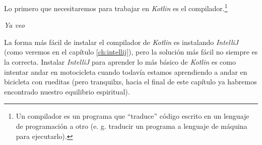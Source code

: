 Lo primero que necesitaremos para trabajar en \textit{Kotlin} es el 
compilador.\footnote{Un compilador es un programa que \enquote{traduce} código escrito en un 
lenguaje de programación a otro (e. g. traducir un programa a lenguaje de máquina para ejecutarlo).}
\begin{center}
  \textit{Ya veo}
\end{center}

La forma más fácil de instalar el compilador de \textit{Kotlin} es instalando 
\textit{IntelliJ} (como veremos en el capítulo \ref{ch:intellij}), pero la 
solución más fácil no siempre es la correcta.
Instalar \textit{IntelliJ} para aprender lo más básico de \textit{Kotlin} es como intentar
andar en motocicleta cuando todavía estamos aprendiendo a andar en bicicleta con rueditas (pero 
tranquilxs, hacia el final de este capítulo ya habremos encontrado nuestro equilibrio espiritual).
